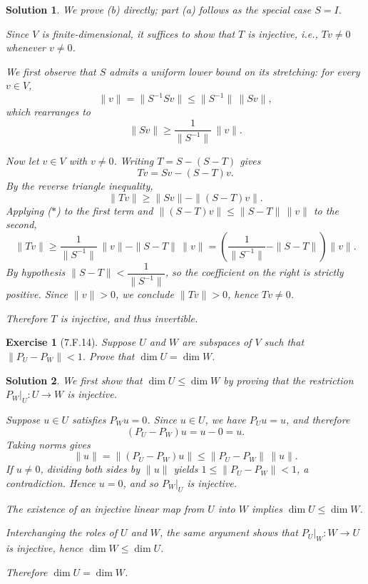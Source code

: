 \documentclass[11pt,a4paper]{article}
\newtheorem*{exercise}{Exercise}
\newtheorem*{solution}{Solution}
\begin{document}
\begin{solution}
We prove (b) directly; part (a) follows as the special case $S = I$.

Since $V$ is finite-dimensional, it suffices to show that $T$ is
injective, i.e., $Tv \neq 0$ whenever $v \neq 0$.

We first observe that $S$ admits a uniform lower bound on its stretching:
for every $v \in V$,
\[
    \|v\| = \|S^{-1} S v\| \leq \|S^{-1}\|\, \|Sv\|,
\]
which rearranges to
\[
    \|Sv\| \geq \frac{1}{\|S^{-1}\|}\, \|v\|. \tag{$\ast$}
\]

Now let $v \in V$ with $v \neq 0$. Writing $T = S - (S - T)$ gives
\[
    Tv = Sv - (S - T)v.
\]
By the reverse triangle inequality,
\[
    \|Tv\| \geq \|Sv\| - \|(S - T)v\|.
\]
Applying ($\ast$) to the first term and $\|(S - T)v\| \leq \|S - T\|\,\|v\|$
to the second,
\[
    \|Tv\|
    \geq \frac{1}{\|S^{-1}\|}\,\|v\| - \|S - T\|\,\|v\|
    = \left( \frac{1}{\|S^{-1}\|} - \|S - T\| \right) \|v\|.
\]
By hypothesis $\|S - T\| < \dfrac{1}{\|S^{-1}\|}$, so the coefficient
on the right is strictly positive. Since $\|v\| > 0$, we conclude
$\|Tv\| > 0$, hence $Tv \neq 0$.

Therefore $T$ is injective, and thus invertible. \qedhere
\end{solution}

\begin{exercise}[7.F.14]
Suppose $U$ and $W$ are subspaces of $V$ such that $\|P_U - P_W\| < 1$.
Prove that $\dim U = \dim W$.
\end{exercise}

\begin{solution}
We first show that $\dim U \leq \dim W$ by proving that the restriction
$P_W|_U : U \to W$ is injective.

Suppose $u \in U$ satisfies $P_W u = 0$. Since $u \in U$, we have
$P_U u = u$, and therefore
\[
    (P_U - P_W)u = u - 0 = u.
\]
Taking norms gives
\[
    \|u\| = \|(P_U - P_W)u\| \leq \|P_U - P_W\|\, \|u\|.
\]
If $u \neq 0$, dividing both sides by $\|u\|$ yields
$1 \leq \|P_U - P_W\| < 1$, a contradiction. Hence $u = 0$, and so
$P_W|_U$ is injective.

The existence of an injective linear map from $U$ into $W$ implies
$\dim U \leq \dim W$.

Interchanging the roles of $U$ and $W$, the same argument shows that
$P_U|_W : W \to U$ is injective, hence $\dim W \leq \dim U$.

Therefore $\dim U = \dim W$. \qedhere
\end{solution}
\end{document}
